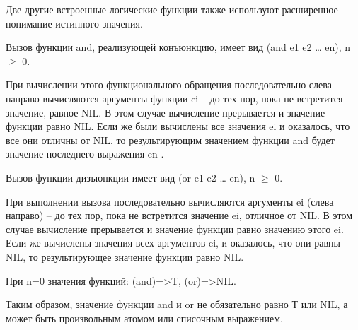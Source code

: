 \documentclass[12pt]{report}
\begin{document}
	Две другие встроенные логические функции также используют расширенное понимание истинного значения. 
	
	Вызов функции and, реализующей конъюнкцию, имеет вид (and e1 e2 … en), n $\geqslant$ 0. 
	
	При вычислении этого функционального обращения последовательно слева направо вычисляются аргументы функции ei – до тех пор, пока не  встретится значение, равное NIL. В этом случае вычисление прерывается и значение функции равно NIL. Если же были вычислены все значения ei и  оказалось, что все они отличны от NIL, то результирующим значением функции and будет значение последнего выражения en .
	
	Вызов функции-дизъюнкции имеет вид (or e1 e2 … en), n $\geqslant$ 0. 
	
	При выполнении вызова последовательно вычисляются аргументы ei (слева направо) – до тех пор, пока не встретится значение ei, отличное от NIL. В этом случае вычисление прерывается и значение функции равно значению этого ei. Если же вычислены значения всех аргументов ei, и оказалось, что они равны NIL, то результирующее значение функции равно NIL.
	
	При n=0 значения функций: (and)=>T, (or)=>NIL.
	
	Таким образом, значение функции and и or не обязательно равно Т или NIL, а может быть произвольным атомом или списочным выражением.
	
\end{document}
